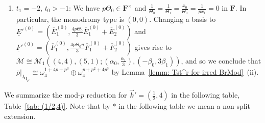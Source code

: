 \documentclass[11pt]{amsart}
\theoremstyle{definition}
\numberwithin{equation}{subsection}
\theoremstyle{plain}
\theoremstyle{plain}
\theoremstyle{plain}
\theoremstyle{plain}
\theoremstyle{plain}
\theoremstyle{plain}
\theoremstyle{plain}
\theoremstyle{plain}
\theoremstyle{plain}
\theoremstyle{plain}
\theoremstyle{plain}
\theoremstyle{plain}
\theoremstyle{definition}
\theoremstyle{definition}
\theoremstyle{definition}
\theoremstyle{remark}
\renewcommand{\(}{\textup{(}}
\renewcommand{\)}{\textup{)}}
\newcommand{\Q}{\mathbf{Q}}
\newcommand{\F}{\mathbf{F}}
\newcommand{\rhobar}{\overline{\rho}}
\newcommand{\cM}{\mathcal{M}}
\newcommand{\barE}{\overline{E}}
\newcommand{\barF}{\overline{F}}
\newcommand{\vk}{\vec{k}}
\newcommand{\IQptwo}{{I_{\Q_{p^2}}}}
\newcommand{\baseE}{\underline{E}}
\newcommand{\baseF}{\underline{F}}
\begin{document}
\begin{enumerate}[leftmargin=*]
\begin{enumerate}[leftmargin=*]
      \item Assume $px_0\neq \frac{3}{4}$ in $\F$. Using $\cM''$ in (a), it is easy to see that $\cM''\cong\cM(5,1;\frac{\beta_0x_0}{\Theta_0},\frac{\alpha_1}{3})$ and $\cM/\cM''\cong\cM(4,4;\alpha_0,4p\beta_1\Theta_0)$, and so we conclude that $\rhobar^{ss}|_\IQptwo\cong\omega_2^{4p}\oplus\omega_2^{1+p}$, by Lemma~\ref{lemm: Tst^r for irred BrMod}~(i). It is not difficult to show that the short exact sequence determined by $\cM'\hookrightarrow \cM$ is non-split.
      \end{enumerate}
  \item $t_1=-2$, $t_0>-1$: We have $p\Theta_0\in\F^\times$ and $\frac{1}{\Theta_0}=\frac{1}{\Theta_1}=\frac{x_0}{\Theta_0}=\frac{1}{px_1}=0$ in $\F$. In particular, the monodromy type is $(0,0)$. Changing a basis to $\baseE'^{(0)}=(\barE_1^{(0)}, \frac{4p\Theta_0}{3}\barE_1^{(0)}+\barE_2^{(0)})$ and $\baseF'^{(0)}=(\barF_1^{(0)},\frac{4p\Theta_0u}{3}\barF_1^{(0)}+\barF_2^{(0)})$
      gives rise to $\cM\cong\cM_1((4,4),(5,1);(\alpha_0,\frac{\alpha_1}{3}),(-\beta_0,3\beta_1))$, and so we conclude that $\rhobar|_\IQptwo \cong\omega_4^{1+4p+p^3}\oplus\omega_4^{p+p^2+4p^3}$ by Lemma~\ref{lemm: Tst^r for irred BrMod}~(ii).
\end{enumerate}
We summarize the mod-$p$ reduction for $\vk'=(\frac{1}{2},4)$ in the following table, Table~\ref{tab: (1/2,4)}. Note that by $\ast$ in the following table we mean a non-split extension.
\end{document}

